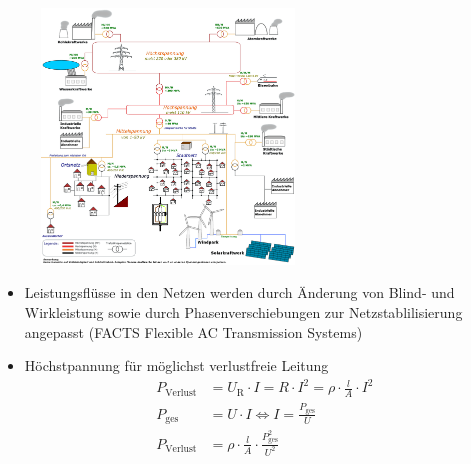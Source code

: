 \documentclass[aspectratio=1610, professionalfonts, 9pt]{beamer}
\begin{document}
{
\begin{frame}
  \begin{figure}
    \includegraphics[width=0.6\textwidth]{images/Stromversorgung.png}
  \end{figure}
\end{frame}
}

\begin{frame}
  \begin{itemize}
    \item Leistungsflüsse in den Netzen werden durch Änderung
      von Blind- und Wirkleistung sowie durch Phasenverschiebungen
      zur Netzstablilisierung angepasst
      (FACTS Flexible AC Transmission Systems)
    \item Höchstpannung für möglichst verlustfreie Leitung
          \begin{align*}
P_{\text{Verlust}}&= U_\text{R}\cdot I = R \cdot I^2 = \rho\cdot\frac{l}{A} \cdot I^2  \\
P_\text{ges}&=U\cdot I \Leftrightarrow I=\frac{P_\text{ges}}{U}\\
P_{\text{Verlust}}&=\rho\cdot\frac{l}{A} \cdot \frac{P_\text{ges}^2}{U^2}
          \end{align*}
  \end{itemize}
\end{frame}
\end{document}
